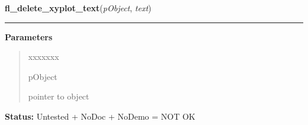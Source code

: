     \label{xformslib:library:fl_delete_xyplot_text}

    \vspace{0.5ex}

\hspace{.8\funcindent}\begin{boxedminipage}{\funcwidth}

    \raggedright \textbf{fl\_delete\_xyplot\_text}(\textit{pObject}, \textit{text})

    \vspace{-1.5ex}

    \rule{\textwidth}{0.5\fboxrule}
\setlength{\parskip}{2ex}
\setlength{\parskip}{1ex}
      \textbf{Parameters}
      \vspace{-1ex}

      \begin{quote}
        \begin{Ventry}{xxxxxxx}

          \item[pObject]

          pointer to object

        \end{Ventry}

      \end{quote}

\textbf{Status:} Untested + NoDoc + NoDemo = NOT OK



    \end{boxedminipage}

    \label{xformslib:library:fl_set_xyplot_maxoverlays}

    \vspace{0.5ex}

